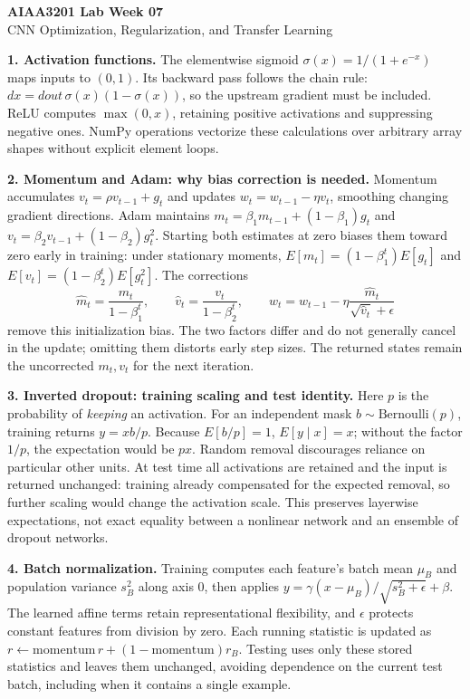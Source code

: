 \documentclass[10pt,a4paper]{article}
\begin{document}
\begin{center}
{\Large\bfseries\color{ink} AIAA3201 Lab Week 07}\\[3pt]
{\normalsize CNN Optimization, Regularization, and Transfer Learning}
\end{center}
\vspace{-5pt}

\textbf{1. Activation functions.}
The elementwise sigmoid $\sigma(x)=1/(1+e^{-x})$ maps inputs to $(0,1)$. Its backward pass follows the chain rule: $dx=dout\,\sigma(x)(1-\sigma(x))$, so the upstream gradient must be included. ReLU computes $\max(0,x)$, retaining positive activations and suppressing negative ones. NumPy operations vectorize these calculations over arbitrary array shapes without explicit element loops.

\textbf{2. Momentum and Adam: why bias correction is needed.}
Momentum accumulates $v_t=\rho v_{t-1}+g_t$ and updates $w_t=w_{t-1}-\eta v_t$, smoothing changing gradient directions. Adam maintains $m_t=\beta_1m_{t-1}+(1-\beta_1)g_t$ and $v_t=\beta_2v_{t-1}+(1-\beta_2)g_t^2$. Starting both estimates at zero biases them toward zero early in training: under stationary moments, $E[m_t]=(1-\beta_1^t)E[g_t]$ and $E[v_t]=(1-\beta_2^t)E[g_t^2]$. The corrections
\[
\widehat m_t=\frac{m_t}{1-\beta_1^t},\qquad
\widehat v_t=\frac{v_t}{1-\beta_2^t},\qquad
w_t=w_{t-1}-\eta\frac{\widehat m_t}{\sqrt{\widehat v_t}+\epsilon}
\]
remove this initialization bias. The two factors differ and do not generally cancel in the update; omitting them distorts early step sizes. The returned states remain the uncorrected $m_t,v_t$ for the next iteration.

\textbf{3. Inverted dropout: training scaling and test identity.}
Here $p$ is the probability of \emph{keeping} an activation. For an independent mask $b\sim\mathrm{Bernoulli}(p)$, training returns $y=xb/p$. Because $E[b/p]=1$, $E[y\mid x]=x$; without the factor $1/p$, the expectation would be $px$. Random removal discourages reliance on particular other units. At test time all activations are retained and the input is returned unchanged: training already compensated for the expected removal, so further scaling would change the activation scale. This preserves layerwise expectations, not exact equality between a nonlinear network and an ensemble of dropout networks.

\textbf{4. Batch normalization.}
Training computes each feature's batch mean $\mu_B$ and population variance $s_B^2$ along axis 0, then applies $y=\gamma(x-\mu_B)/\sqrt{s_B^2+\epsilon}+\beta$. The learned affine terms retain representational flexibility, and $\epsilon$ protects constant features from division by zero. Each running statistic is updated as $r\leftarrow\mathrm{momentum}\,r+(1-\mathrm{momentum})r_B$. Testing uses only these stored statistics and leaves them unchanged, avoiding dependence on the current test batch, including when it contains a single example.
\end{document}

